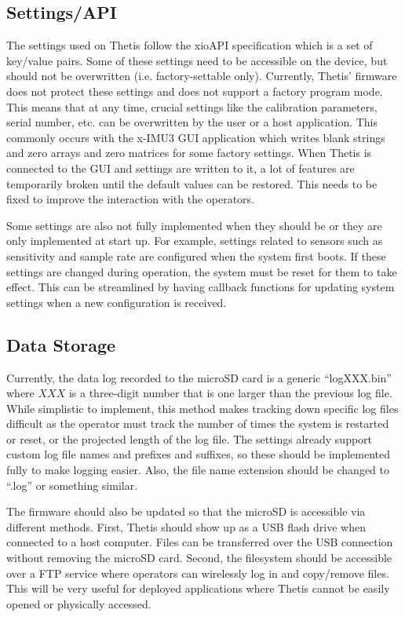 \subsection{Settings/API}
The settings used on Thetis follow the xioAPI specification which is a set of key/value pairs.
Some of these settings need to be accessible on the device, but should not be overwritten (i.e. factory-settable only).
Currently, Thetis' firmware does not protect these settings and does not support a factory program mode.
This means that at any time, crucial settings like the calibration parameters, serial number, etc. can be overwritten by the user or a host application.
This commonly occurs with the x-IMU3 GUI application which writes blank strings and zero arrays and zero matrices for some factory settings.
When Thetis is connected to the GUI and settings are written to it, a lot of features are temporarily broken until the default values can be restored.
This needs to be fixed to improve the interaction with the operators.

Some settings are also not fully implemented when they should be or they are only implemented at start up.
For example, settings related to sensors such as sensitivity and sample rate are configured when the system first boots.
If these settings are changed during operation, the system must be reset for them to take effect.
This can be streamlined by having callback functions for updating system settings when a new configuration is received.

\subsection{Data Storage}
Currently, the data log recorded to the microSD card is a generic ``logXXX.bin'' where $XXX$ is a three-digit number that is one larger than the previous log file.
While simplistic to implement, this method makes tracking down specific log files difficult as the operator must track the number of times the system is restarted or reset, or the projected length of the log file.
The settings already support custom log file names and prefixes and suffixes, so these should be implemented fully to make logging easier.
Also, the file name extension should be changed to ``.log'' or something similar.

The firmware should also be updated so that the microSD is accessible via different methods.
First, Thetis should show up as a USB flash drive when connected to a host computer.
Files can be transferred over the USB connection without removing the microSD card.
Second, the filesystem should be accessible over a FTP service where operators can wirelessly log in and copy/remove files.
This will be very useful for deployed applications where Thetis cannot be easily opened or physically accessed.

